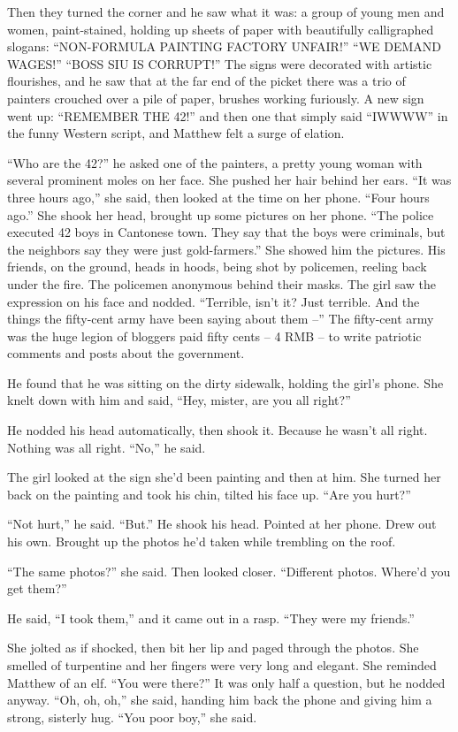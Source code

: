 Then they turned the corner and he saw what it was: a group of
young men and women, paint-stained, holding up sheets of paper with
beautifully calligraphed slogans: ``NON-FORMULA PAINTING FACTORY
UNFAIR!'' ``WE DEMAND WAGES!'' ``BOSS SIU IS CORRUPT!'' The signs were
decorated with artistic flourishes, and he saw that at the far end
of the picket there was a trio of painters crouched over a pile of
paper, brushes working furiously. A new sign went up: ``REMEMBER THE
42!'' and then one that simply said ``IWWWW'' in the funny Western
script, and Matthew felt a surge of elation.

``Who are the 42?'' he asked one of the painters, a pretty young
woman with several prominent moles on her face. She pushed her hair
behind her ears. ``It was three hours ago,'' she said, then looked at
the time on her phone. ``Four hours ago.'' She shook her head,
brought up some pictures on her phone. ``The police executed 42 boys
in Cantonese town. They say that the boys were criminals, but the
neighbors say they were just gold-farmers.'' She showed him the
pictures. His friends, on the ground, heads in hoods, being shot by
policemen, reeling back under the fire. The policemen anonymous
behind their masks. The girl saw the expression on his face and
nodded. ``Terrible, isn't it? Just terrible. And the things the
fifty-cent army have been saying about them --'' The fifty-cent army
was the huge legion of bloggers paid fifty cents -- 4 RMB -- to
write patriotic comments and posts about the government.

He found that he was sitting on the dirty sidewalk, holding the
girl's phone. She knelt down with him and said, ``Hey, mister, are
you all right?''

He nodded his head automatically, then shook it. Because he wasn't
all right. Nothing was all right. ``No,'' he said.

The girl looked at the sign she'd been painting and then at him.
She turned her back on the painting and took his chin, tilted his
face up. ``Are you hurt?''

``Not hurt,'' he said. ``But.'' He shook his head. Pointed at her
phone. Drew out his own. Brought up the photos he'd taken while
trembling on the roof.

``The same photos?'' she said. Then looked closer. ``Different photos.
Where'd you get them?''

He said, ``I took them,'' and it came out in a rasp. ``They were my
friends.''

She jolted as if shocked, then bit her lip and paged through the
photos. She smelled of turpentine and her fingers were very long
and elegant. She reminded Matthew of an elf. ``You were there?'' It
was only half a question, but he nodded anyway. ``Oh, oh, oh,'' she
said, handing him back the phone and giving him a strong, sisterly
hug. ``You poor boy,'' she said.


